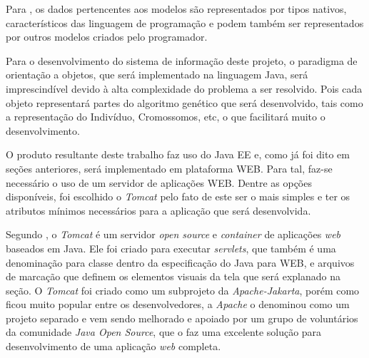 \par Para , 
os dados pertencentes aos modelos são representados por tipos nativos,
característicos das linguagem de programação e podem também ser representados
por outros modelos criados pelo programador.


\par Para o desenvolvimento do sistema de informação deste projeto, o paradigma
de orientação a objetos, que será implementado na linguagem Java, será
imprescindível devido à alta complexidade do problema a ser resolvido. Pois cada objeto representará partes do algoritmo genético que será desenvolvido, tais
como a representação do Indivíduo, Cromossomos, etc, o que facilitará muito o
desenvolvimento.

\par O produto resultante deste trabalho faz uso do Java EE e, como já foi dito
em seções anteriores, será implementado em plataforma WEB. Para tal, faz-se
necessário o uso de um servidor de aplicações WEB. Dentre as opções disponíveis, foi escolhido o \textit{Tomcat} pelo fato de este ser o mais simples e ter os atributos mínimos necessários para a aplicação que
será desenvolvida.

\par Segundo , o \textit{Tomcat} é um
servidor \textit{open source} e \textit{container} de aplicações \textit{web}
baseados em Java. Ele foi criado para executar \textit{servlets}, que também é
uma denominação para classe dentro da especificação do Java para WEB, e arquivos
de marcação que definem os elementos visuais da tela que será explanado na seção.
O \textit{Tomcat} foi criado como um subprojeto da \textit{Apache-Jakarta}, porém como ficou
muito popular entre os desenvolvedores, a \textit{Apache} o denominou como um
projeto separado e vem sendo melhorado e apoiado por um grupo de voluntários da comunidade \textit{Java Open Source}, que o faz 
uma excelente solução para desenvolvimento de uma aplicação \textit{web} completa. 

